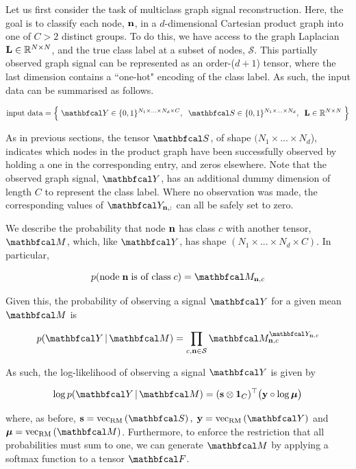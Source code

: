 Let us first consider the task of multiclass graph signal reconstruction. Here, the goal is to classify each node, $\mathbf{n}$, in a $d$-dimensional Cartesian product graph into one of $C>2$ distinct groups. To do this, we have access to the graph Laplacian $\mathbf{L} \in \mathbb{R}^{N \times N}$, and the true class label at a subset of nodes, $\mathcal{S}$. This partially observed graph signal can be represented as an order-($d + 1$) tensor, where the last dimension contains a ``one-hot" encoding of the class label. As such, the input data can be summarised as follows. 

\begin{equation*}
    \text{input data} = \Big\{\; \Yt \in \{0, 1\}^{N_1 \times ... \times N_d \times C}, \;\; \St \in \{0, 1\}^{N_1 \times ... \times N_d} , \;\; \LL \in \R^{N \times N} \; \Big\}
\end{equation*}

As in previous sections, the tensor $\St$, of shape $(N_1 \times ... \times N_d$), indicates which nodes in the product graph have been successfully observed by holding a one in the corresponding entry, and zeros elsewhere. Note that the observed graph signal, $\Yt$, has an additional dummy dimension of length $C$ to represent the class label. Where no observation was made, the corresponding values of $\Yt_{\nn, :}$ can all be safely set to zero. 

We describe the probability that node $\mathbf{n}$ has class $c$ with another tensor, $\Mt$, which, like $\Yt$, has shape $(N_1 \times ... \times N_d \times C)$. In particular, 

\begin{equation*}
    p(\text{node} \; \nn \; \text{is of class} \; c) = \Mt_{\nn, c}
\end{equation*}

Given this, the probability of observing a signal $\Yt$ for a given mean $\Mt$ is

\begin{equation}
    p(\Yt \, | \, \Mt) = \prod_{c, \nn \in \mathcal{S}} \Mt_{\nn, c}^{\Yt_{\nn, c}}
\end{equation}

As such, the log-likelihood of observing a signal $\Yt$ is given by 

\begin{equation}
   \log p(\Yt \, | \, \Mt) = (\s \otimes \one_C)^\top \big(\y \circ \log \muu \big)
\end{equation}

where, as before, $\s = \vecrm{\St}, \; \y = \vecrm{\Yt}$ and $\muu = \vecrm{\Mt}$. Furthermore, to enforce the restriction that all probabilities must sum to one, we can generate $\Mt$ by applying a softmax function to a tensor $\Ft$. 

